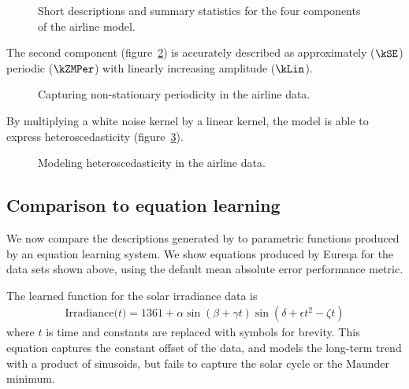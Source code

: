 \begin{figure}[h]
\centering
{}
\caption[Summaries produced by \procedurename{} for the airline data.]{
Short descriptions and summary statistics for the four components of the airline model.}
\label{fig:exec-airline}
\end{figure}

The second component (figure~\ref{fig:lin_periodic}) is accurately described as approximately ($\kSE$) periodic ($\kZMPer$) with linearly increasing amplitude ($\kLin$).
%
\begin{figure}[h]
\centering
{}
\caption{Capturing non-stationary periodicity in the airline data.}
\label{fig:lin_periodic}
\end{figure}
%
By multiplying a white noise kernel by a linear kernel, the model is able to express heteroscedasticity (figure~\ref{fig:heteroscedastic}).
%
\begin{figure}[h]
\centering
{}
\caption{Modeling heteroscedasticity in the airline data.}
\label{fig:heteroscedastic}
\end{figure}

\subsection{Comparison to equation learning}
\label{sec:eqn-learning-comp}

We now compare the descriptions generated by \procedurename{} to parametric functions produced by an equation learning system.
We show equations produced by Eureqa \citep{Nutonian2011-el} for the data sets shown above, using the default mean absolute error performance metric.

The learned function for the solar irradiance data is
\begin{align*}
\textrm{Irradiance($t$)} = 1361 + \alpha\sin(\beta + \gamma t)\sin(\delta + \epsilon t^2 - \zeta t)
\end{align*}
where $t$ is time and constants are replaced with symbols for brevity.
This equation captures the constant offset of the data, and models the long-term trend with a product of sinusoids, but fails to capture the solar cycle or the Maunder minimum.%

